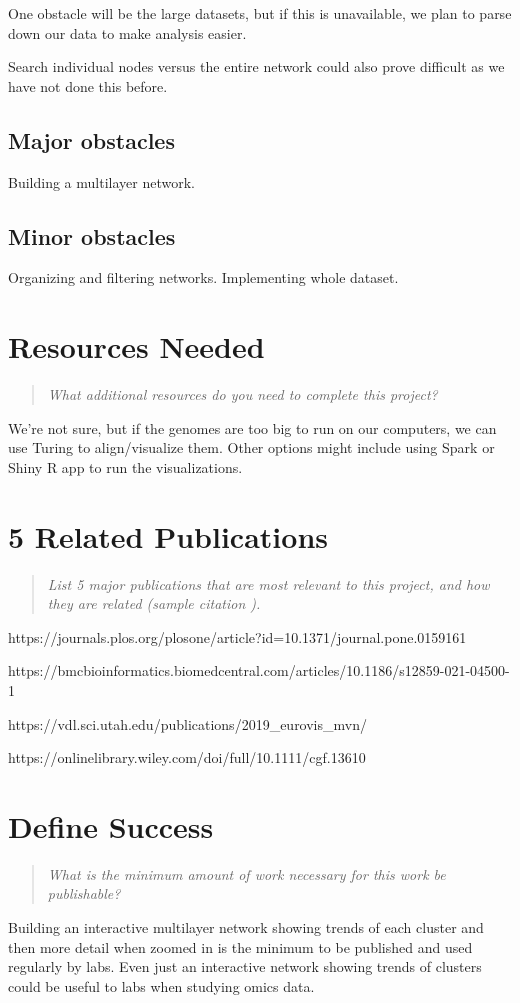 \documentclass{proc}
\begin{document}
One obstacle will be the large datasets, but if this is unavailable, we plan to parse down our data to make analysis easier.

Search individual nodes versus the entire network could also prove difficult as we have not done this before.

\subsection{Major obstacles} %

Building a multilayer network.

\subsection{Minor obstacles}

Organizing and filtering networks. Implementing whole dataset.

\section{Resources Needed}
\begin{quote}
\textit{What additional resources do you need to complete this project?}
\end{quote}

We're not sure, but if the genomes are too big to run on our computers, we can use Turing to align/visualize them. Other options might include using Spark or Shiny R app to run the visualizations.

\section{5 Related Publications}
\begin{quote}
\textit{List 5 major publications that are most relevant to this project, and how they are related (sample citation \cite{wijk2005value}).}
\end{quote}

https://journals.plos.org/plosone/article?id=10.1371/journal.pone.0159161

https://bmcbioinformatics.biomedcentral.com/articles/10.1186/s12859-021-04500-1

https://vdl.sci.utah.edu/publications/2019_eurovis_mvn/

https://onlinelibrary.wiley.com/doi/full/10.1111/cgf.13610



\section{Define Success}
\begin{quote}
\textit{What is the minimum amount of work necessary for this work be publishable?}
\end{quote}

Building an interactive multilayer network showing trends of each cluster and then more detail when zoomed in is the minimum to be published and used regularly by labs. Even just an interactive network showing trends of clusters could be useful to labs when studying omics data.



\end{document}
